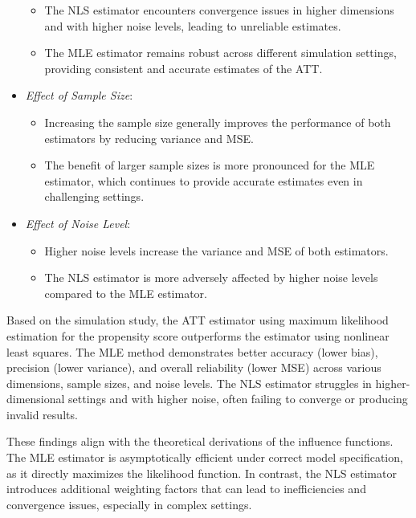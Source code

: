 \documentclass{article}
\begin{document}
\begin{itemize}
\begin{itemize}
        \item The NLS estimator encounters convergence issues in higher dimensions and with higher noise levels, leading to unreliable estimates.
        \item The MLE estimator remains robust across different simulation settings, providing consistent and accurate estimates of the ATT.
    \end{itemize}
    \item \textit{Effect of Sample Size}:
    \begin{itemize}
        \item Increasing the sample size generally improves the performance of both estimators by reducing variance and MSE.
        \item The benefit of larger sample sizes is more pronounced for the MLE estimator, which continues to provide accurate estimates even in challenging settings.
    \end{itemize}
    \item \textit{Effect of Noise Level}:
    \begin{itemize}
        \item Higher noise levels increase the variance and MSE of both estimators.
        \item The NLS estimator is more adversely affected by higher noise levels compared to the MLE estimator.
    \end{itemize}
\end{itemize}

Based on the simulation study, the ATT estimator using maximum likelihood estimation for the propensity score outperforms the estimator using nonlinear least squares. The MLE method demonstrates better accuracy (lower bias), precision (lower variance), and overall reliability (lower MSE) across various dimensions, sample sizes, and noise levels. The NLS estimator struggles in higher-dimensional settings and with higher noise, often failing to converge or producing invalid results.

These findings align with the theoretical derivations of the influence functions. The MLE estimator is asymptotically efficient under correct model specification, as it directly maximizes the likelihood function. In contrast, the NLS estimator introduces additional weighting factors that can lead to inefficiencies and convergence issues, especially in complex settings.
\end{document}
